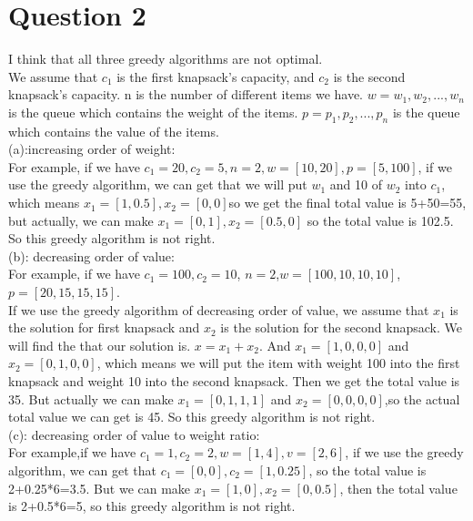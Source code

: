 \documentclass[paper=a4, fontsize=11pt]{scrartcl} %
\numberwithin{equation}{section} %
\numberwithin{figure}{section} %
\numberwithin{table}{section} %
\begin{document}
\vspace{2cm}
\section{\textbf{Question 2}}
I think that all three greedy algorithms are not optimal. \\ We assume that $c_1$ is the first knapsack's capacity, and $c_2$ is the second knapsack's capacity. n is the number of different items we have. $w={w_1,w_2,...,w_n}$ is the queue which contains the weight of the items. $p={p_1,p_2,...,p_n}$ is the queue which contains the value of the items. \\
(a):increasing order of weight:\\
For example, if we have $c_1=20,c_2=5, n=2, w=[10,20],p=[5,100]$, if we use the greedy algorithm, we can get that we will put $w_1$ and 10 of $w_2$ into $c_1$, which means $x_1=[1,0.5],x_2=[0,0]$so we get the final total value is 5+50=55, but actually, we can make $x_1=[0,1],x_2=[0.5,0]$ so the total value is 102.5. So this greedy algorithm is not right.\\
(b): decreasing order of value:\\
For example, if we have $c_1=100,c_2=10$, $n=2$,$w=[100,10,10,10]$,$p=[20,15,15,15]$. \\
If we use the greedy algorithm of decreasing order of value, we assume that $x_1$ is the solution for first knapsack and  $x_2$ is the solution for the second knapsack. We will find the that our solution is. $x=x_1+x_2$. And $x_1=[1,0,0,0]$ and $x_2=[0,1,0,0]$, which means we will put the item with weight 100 into the first knapsack and weight 10 into the second knapsack. Then we get the total value is 35. But actually we can make $x_1=[0,1,1,1]$ and $x_2=[0,0,0,0]$,so the actual total value we can get is 45. So this greedy algorithm is not right. \\
(c): decreasing order of value to weight ratio:\\
For example,if we have $c_1=1,c_2=2,w=[1,4],v=[2,6]$, if we use the greedy algorithm, we can get that $c_1=[0,0],c_2=[1,0.25]$, so the total value is 2+0.25*6=3.5. But we can make $x_1=[1,0],x_2=[0,0.5]$, then the total value is 2+0.5*6=5, so this greedy algorithm is not right.\\

\vspace{2cm}
\end{document}
